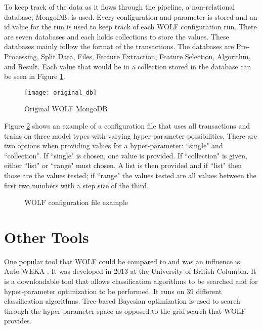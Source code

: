 To keep track of the data as it flows through the pipeline, a non-relational database, MongoDB, is used. Every configuration and parameter is stored and an id value for the run is used to keep track of each WOLF configuration run. There are seven databases and each holds collections to store the values. These databases mainly follow the format of the transactions. The databases are Pre-Processing, Split Data, Files, Feature Extraction, Feature Selection, Algorithm, and Result. Each value that would be in a collection stored in the database can be seen in Figure \ref{fig:original WOLF database}.

\begin{figure}[H]
	\centering
	\texttt{[image: original\_db]}
	\caption{Original WOLF MongoDB \parencite{WOLFprojectreport}}
	\label{fig:original WOLF database}
\end{figure}

Figure \ref{fig:wolf configuration} shows an example of a configuration file that uses all transactions and trains on three model types with varying hyper-parameter possibilities. There are two options when providing values for a hyper-parameter: ``single" and ``collection". If ``single" is chosen, one value is provided. If ``collection" is given, either ``list" or ``range" must chosen. A list is then provided and if ``list" then those are the values tested; if ``range" the values tested are all values between the first two numbers with a step size of the third.

\newpage
\begin{figure}[H]
	\centering
	
	\caption{WOLF configuration file example}
	\label{fig:wolf configuration}
\end{figure}

\section*{Other Tools}
One popular tool that WOLF could be compared to and was an influence is Auto-WEKA \parencite{AutoWEKA}. It was developed in 2013 at the University of British Columbia. It is a downloadable tool that allows classification algorithms to be searched and for hyper-parameter optimization to be performed. It runs on 39 different classification algorithms. Tree-based Bayesian optimization is used to search through the hyper-parameter space as opposed to the grid search that WOLF provides.


